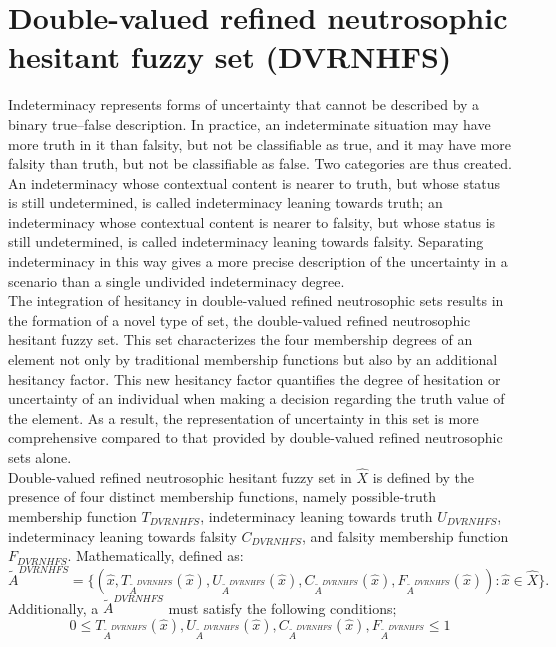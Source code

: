 \documentclass[a4paper]{elsarticle}
\begin{document}
{\section{Double-valued refined neutrosophic hesitant fuzzy set (DVRNHFS)}
\noindent Indeterminacy represents forms of uncertainty that cannot be described by a binary true--false description. In practice, an indeterminate situation may have more truth in it than falsity, but not be classifiable as true, and it may have more falsity than truth, but not be classifiable as false. Two categories are thus created. An indeterminacy whose contextual content is nearer to truth, but whose status is still undetermined, is called indeterminacy leaning towards truth; an indeterminacy whose contextual content is nearer to falsity, but whose status is still undetermined, is called indeterminacy leaning towards falsity. Separating indeterminacy in this way gives a more precise description of the uncertainty in a scenario than a single undivided indeterminacy degree.\\
The integration of hesitancy in double-valued refined neutrosophic sets results in the formation of a novel type of set, the double-valued refined neutrosophic hesitant fuzzy set. This set characterizes the four membership degrees of an element not only by traditional membership functions but also by an additional hesitancy factor. This new hesitancy factor quantifies the degree of hesitation or uncertainty of an individual when making a decision regarding the truth value of the element. As a result, the representation of uncertainty in this set is more comprehensive compared to that provided by double-valued refined neutrosophic sets alone.\\
Double-valued refined neutrosophic hesitant fuzzy set in $\hat{X}$ is defined by the presence of four distinct membership functions, namely possible-truth membership function $T_{DVRNHFS}$, indeterminacy leaning towards truth $U_{DVRNHFS}$, indeterminacy leaning towards falsity $C_{DVRNHFS}$, and falsity membership function $F_{DVRNHFS}$. Mathematically, defined as:
\small
\begin{equation*}
\tilde{A}^{DVRNHFS}=\{(\hat{x},T_{\tilde{A}^{DVRNHFS}}(\hat{x}),U_{\tilde{A}^{DVRNHFS}}(\hat{x}),C_{\tilde{A}^{DVRNHFS}}(\hat{x}),F_{\tilde{A}^{DVRNHFS}}(\hat{x})) : \hat{x} \in \hat{X}\}.
\end{equation*}
Additionally, a $\tilde{A}^{DVRNHFS}$ must satisfy the following conditions; $$0\leq T_{\tilde{A}^{DVRNHFS}}(\hat{x}), U_{\tilde{A}^{DVRNHFS}}(\hat{x}), C_{\tilde{A}^{DVRNHFS}}(\hat{x}), F_{\tilde{A}^{DVRNHFS}}\leq1$$
}
\end{document}

